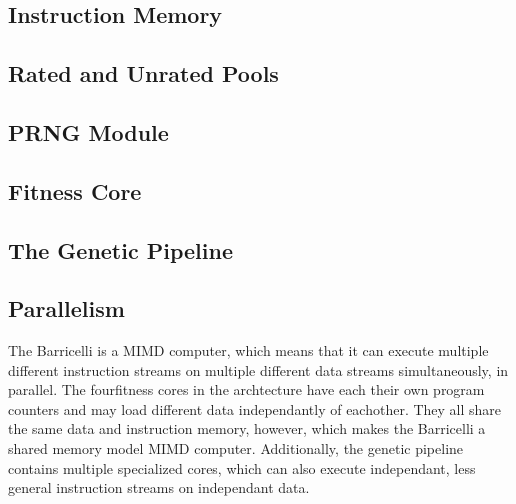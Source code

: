 

\subsection{Instruction Memory}
\label{subsec:fpga-instruction-memory}



\subsection{Rated and Unrated Pools}


\subsection{PRNG Module}
    
 

\subsection{Fitness Core} \label{fpga:fitness:ss:design_of_the_fitness_core}
     \label{fpga:subsection:fitness_core}


\subsection{The Genetic Pipeline}


\subsection{Parallelism}
The Barricelli is a MIMD computer, which means that it can execute multiple different instruction streams on multiple different data streams simultaneously, in parallel.
The four\cn fitness cores in the archtecture have each their own program counters and may load different data independantly of eachother.
They all share the same data and instruction memory, however, which makes the Barricelli a shared memory model MIMD computer.
Additionally, the genetic pipeline contains multiple specialized cores, which can also execute independant, less general instruction streams on independant data.

